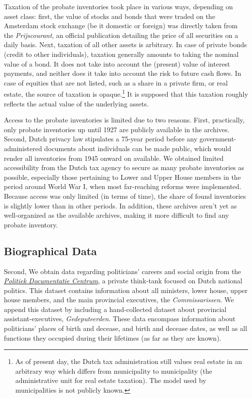 Taxation of the probate inventories took place in various ways, depending on asset class: first, the value of stocks and bonds that were traded on the Amsterdam stock exchange (be it domestic or foreign) was directly taken from the \textit{Prijscourant}, an official publication detailing the price of all securities on a daily basis. Next, taxation of all other assets is arbitrary. In case of private bonds (credit to other individuals), taxation generally amounts to taking the nominal value of a bond. It does not take into account the (present) value of interest payments, and neither does it take into account the risk to future cash flows. In case of equities that are not listed, such as a share in a private firm, or real estate, the source of taxation is opaque.\footnote{As of present day, the Dutch tax administration still values real estate in an arbitrary way which differs from municipality to municipality (the administrative unit for real estate taxation). The model used by municipalities is not publicly known.} It is supposed that this taxation roughly reflects the actual value of the underlying assets. 

Access to the probate inventories is limited due to two reasons. First, practically, only probate inventories up until 1927 are publicly available in the archives. Second, Dutch privacy law stipulates a 75-year period before any government-administered documents about individuals can be made public, which would render all inventories from 1945 onward on available. We obtained limited accessibility from the Dutch tax agency to secure as many probate inventories as possible, especially those pertaining to Lower and Upper House members in the period around World War I, when most far-reaching reforms were implemented. Because access was only limited (in terms of time), the share of found inventories is slightly lower than in other periods. In addition, these archives aren't yet as well-organized as the available archives, making it more difficult to find any probate inventory. 

\subsection{Biographical Data}
Second, We obtain data regarding politicians' careers and social origin from the \href{www.pdc.nl}{\textit{Politiek Documentatie Centrum}}, a private think-tank focused on Dutch national politics. This dataset contains information about all ministers, lower house, upper house members, and the main provincial executives, the \textit{Commissarissen}. We append this dataset by including a hand-collected dataset about provincial assistant-executives, \textit{Gedeputeerden}. These data encompass information about politicians' places of birth and decease, and birth and decease dates, as well as all functions they occupied during their lifetimes (as far as they are known). 

